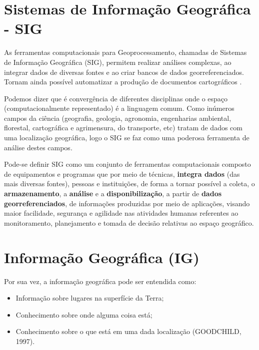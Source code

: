 \documentclass[
]{book}
\begin{document}
\hypertarget{sistemas-de-informauxe7uxe3o-geogruxe1fica---sig}{%
\section{Sistemas de Informação Geográfica - SIG}\label{sistemas-de-informauxe7uxe3o-geogruxe1fica---sig}}

As ferramentas computacionais para Geoprocessamento, chamadas de Sistemas de Informação Geográfica (SIG), permitem realizar análises complexas, ao integrar dados de diversas fontes e ao criar bancos de dados georreferenciados. Tornam ainda possível automatizar a produção de documentos cartográficos \citep{CamaraDavis2001}.

Podemos dizer que é convergência de diferentes disciplinas onde o espaço (computacionalmente representado) é a linguagem comum. Como inúmeros campos da ciência (geografia, geologia, agronomia, engenharias ambiental, florestal, cartográfica e agrimensura, do transporte, etc) tratam de dados com uma localização geográfica, logo o SIG se faz como uma poderosa ferramenta de análise destes campos.

Pode-se definir SIG como um conjunto de ferramentas computacionais composto de equipamentos e programas que por meio de técnicas, \textbf{integra dados} (das mais diversas fontes), pessoas e instituições, de forma a tornar possível a coleta, o \textbf{armazenamento}, a \textbf{análise} e a \textbf{disponibilização}, a partir de \textbf{dados georreferenciados}, de informações produzidas por meio de aplicações, visando maior facilidade, segurança e agilidade nas atividades humanas referentes ao monitoramento, planejamento e tomada de decisão relativas ao espaço geográfico.

\hypertarget{informauxe7uxe3o-geogruxe1fica-ig}{%
\section{Informação Geográfica (IG)}\label{informauxe7uxe3o-geogruxe1fica-ig}}

Por sua vez, a informação geográfica pode ser entendida como:

\begin{itemize}
\item
  Informação sobre lugares na superfície da Terra;
\item
  Conhecimento sobre onde alguma coisa está;
\item
  Conhecimento sobre o que está em uma dada localização (GOODCHILD, 1997).
\end{itemize}
\end{document}
